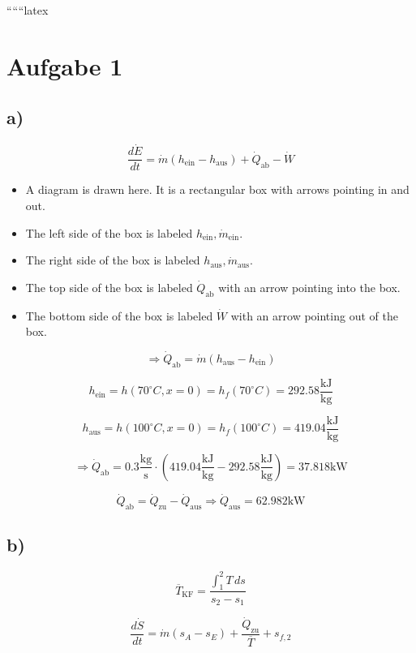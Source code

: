 
``````latex


\section*{Aufgabe 1}

\subsection*{a)}

\[
\frac{d\dot{E}}{dt} = \dot{m} (h_{\text{ein}} - h_{\text{aus}}) + \dot{Q}_{\text{ab}} - \dot{W}
\]

\begin{itemize}
    \item A diagram is drawn here. It is a rectangular box with arrows pointing in and out.
    \item The left side of the box is labeled $h_{\text{ein}}, \dot{m}_{\text{ein}}$.
    \item The right side of the box is labeled $h_{\text{aus}}, \dot{m}_{\text{aus}}$.
    \item The top side of the box is labeled $\dot{Q}_{\text{ab}}$ with an arrow pointing into the box.
    \item The bottom side of the box is labeled $\dot{W}$ with an arrow pointing out of the box.
\end{itemize}

\[
\Rightarrow \dot{Q}_{\text{ab}} = \dot{m} (h_{\text{aus}} - h_{\text{ein}})
\]

\[
h_{\text{ein}} = h(70^\circ C, x=0) = h_f(70^\circ C) = 292.58 \frac{\text{kJ}}{\text{kg}}
\]

\[
h_{\text{aus}} = h(100^\circ C, x=0) = h_f(100^\circ C) = 419.04 \frac{\text{kJ}}{\text{kg}}
\]

\[
\Rightarrow \dot{Q}_{\text{ab}} = 0.3 \frac{\text{kg}}{\text{s}} \cdot \left( 419.04 \frac{\text{kJ}}{\text{kg}} - 292.58 \frac{\text{kJ}}{\text{kg}} \right) = 37.818 \text{kW}
\]

\[
\dot{Q}_{\text{ab}} = \dot{Q}_{\text{zu}} - \dot{Q}_{\text{aus}} \Rightarrow \dot{Q}_{\text{aus}} = 62.982 \text{kW}
\]

\subsection*{b)}

\[
\overline{T}_{\text{KF}} = \frac{\int_1^2 T \, ds}{s_2 - s_1}
\]

\[
\frac{d\dot{S}}{dt} = \dot{m} (s_A - s_E) + \frac{\dot{Q}_{\text{zu}}}{\overline{T}} + s_{f,2}
\]

